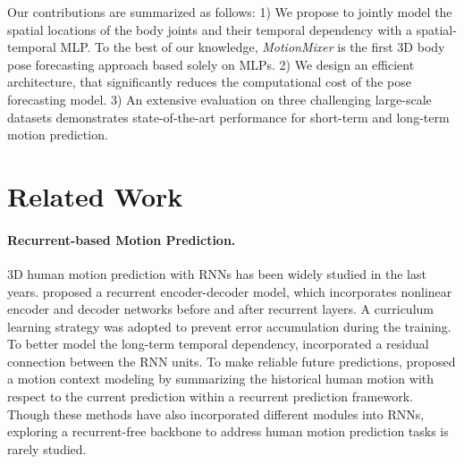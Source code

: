 \documentclass{article}
\begin{document}
Our contributions are summarized as follows:
1) We propose to jointly model the spatial locations of the body joints and their temporal dependency with a spatial-temporal MLP. To the best of our knowledge, \textit{MotionMixer} is the first 3D body pose forecasting approach based solely on MLPs. 2) We design an efficient architecture, that significantly reduces the computational cost of the pose forecasting model. 3) An extensive evaluation on three challenging large-scale datasets demonstrates state-of-the-art performance for short-term and long-term motion prediction.

\section{Related Work}

\paragraph{Recurrent-based Motion Prediction.}
3D human motion prediction with RNNs has been widely studied in the last years.  \cite{fragkiadaki2015recurrent} proposed a recurrent encoder-decoder model, which incorporates nonlinear encoder and decoder networks before and after recurrent layers. A curriculum learning strategy was adopted to prevent error accumulation during the training. To better model the long-term temporal dependency,  \cite{martinez2017human} incorporated a residual connection between the RNN units. To make reliable future predictions, \cite{tang2018long} proposed a motion context modeling by summarizing the historical human motion with respect to the current prediction within a recurrent prediction framework. Though these methods have also incorporated different modules into RNNs, exploring a recurrent-free backbone to address human motion prediction tasks is rarely studied.
\end{document}

